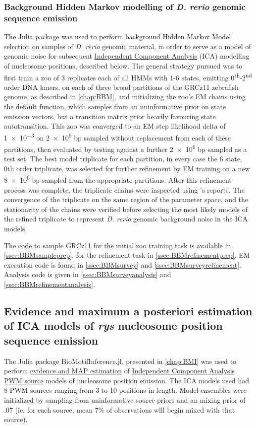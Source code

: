 \documentclass{ut-thesis}
\begin{document}
\begin{NoHyper}
\subsubsection{Background Hidden Markov modelling of \textit{D. rerio} genomic sequence emission}
The Julia package  was used to perform background Hidden Markov Model selection on samples of \textit{D. rerio} genomic material, in order to serve as a model of genomic noise for subsequent \hyperref[ssec:ICA]{Independent Component Analysis} (ICA) modelling of nucleosome positions, described below. The general strategy pursued was to first train a zoo of 3 replicates each of all HMMs with 1-6 states, emitting 0\textsuperscript{th}-2\textsuperscript{nd} order DNA kmers, on each of three broad partitions of the GRCz11 zebrafish genome, as described in \autoref{chap:BBM}, and initializing the zoo's EM chains using the default  function, which samples from an uninformative prior on state emission vectors, but a transition matrix prior heavily favouring state autotransition. This zoo was converged to an EM step likelihood delta of \num{1e-3} on \num{2e6} bp sampled without replacement from each of these partitions, then evaluated by testing against a further \num{2e6} bp sampled as a test set. The best model triplicate for each partition, in every case the 6 state, 0th order triplicate, was selected for further refinement by EM training on a new \num{8e6} bp sampled from the appropriate partitions. After this refinement process was complete, the triplicate chains were inspected using 's reports. The convergence of the triplicate on the same region of the parameter space, and the stationarity of the chains were verified before selecting the most likely models of the refined triplicate to represent \textit{D. rerio} genomic background noise in the  ICA models.

The code to sample GRCz11 for the initial zoo training task is available in \autoref{ssec:BBMsampleprep}, for the refinement task in \autoref{ssec:BBMrefinementprep}. EM execution code is found in \autoref{ssec:BBMsurvey} and \autoref{ssec:BBMsurveyrefinement}. Analysis code is given in \autoref{ssec:BBMsurveyanalysis} and \autoref{ssec:BBMrefinementanalysis}.

\subsection{Evidence and maximum a posteriori estimation of ICA models of \textit{rys} nucleosome position sequence emission}
\label{ssec:rysBMI}
The Julia package BioMotifInference.jl, presented in \autoref{chap:BMI} was used to perform \hyperref[ssec:BayesEpistemology]{evidence and MAP estimation} of \hyperref[ssec:ICA]{Independent Component Analysis} \hyperref[ssec:PWM]{PWM source} models of nucleosome position emission. The ICA models used had 8 PWM sources ranging from 3 to 10 positions in length. Model ensembles were initialized by sampling from uninformative source priors and an mixing prior of .07 (ie. for each source, mean 7\% of observations will begin mixed with that source).


\end{NoHyper}
\end{document}
